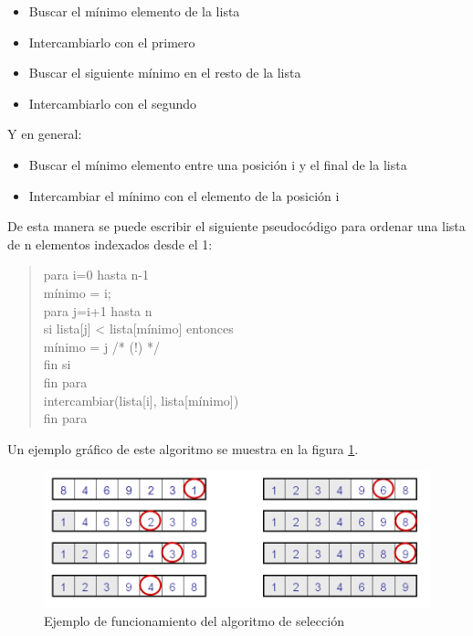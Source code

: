 \documentclass[8pt, A4]{article}    %
\newcommand\tab[1][1cm]{\hspace*{#1}}
\begin{document}
\begin{itemize}
	\item Buscar el mínimo elemento de la lista
    \item Intercambiarlo con el primero
    \item Buscar el siguiente mínimo en el resto de la lista
    \item Intercambiarlo con el segundo
\end{itemize}
Y en general:
\begin{itemize}
   \item  Buscar el mínimo elemento entre una posición i y el final de la lista
    \item Intercambiar el mínimo con el elemento de la posición i
\end{itemize}

De esta manera se puede escribir el siguiente pseudocódigo para ordenar una lista de n elementos indexados desde el 1:
\begin{quote}
para i=0 hasta n-1\\
    \tab mínimo = i;\\
    \tab para j=i+1 hasta n\\
        \tab \tab si lista[j] < lista[mínimo] entonces\\
            \tab \tab \tab mínimo = j /* (!) */\\
        \tab \tab fin si\\
    \tab fin para\\
    \tab intercambiar(lista[i], lista[mínimo])\\
fin para\\
\end{quote}

Un ejemplo gráfico de este algoritmo se muestra en la figura \ref{fig:selectionSortInfo}.

\begin{figure}[h]
\begin{center}
\includegraphics[width=1\textwidth]{graph/selectionSortInfo}
\end{center}
\caption{Ejemplo de funcionamiento del algoritmo de selección}
\label{fig:selectionSortInfo}
\end{figure}
\end{document}
